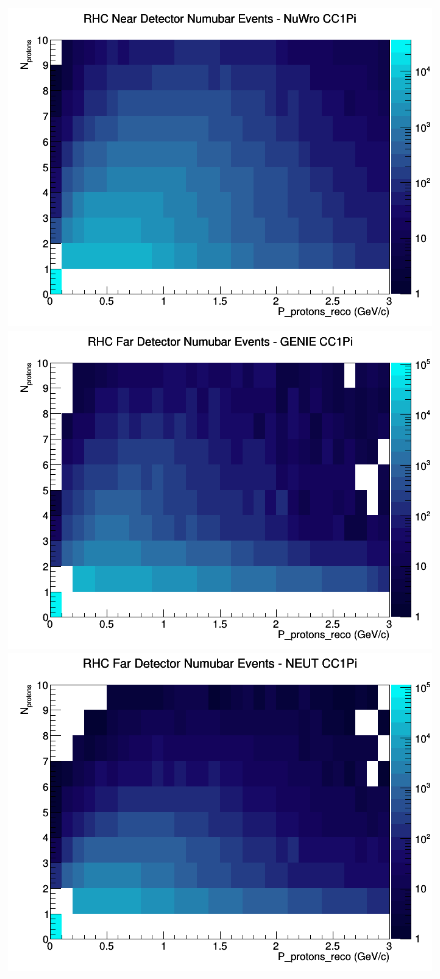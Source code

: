 \documentclass[12pt]{article}
\begin{document}
\begin{figure}[h]
\includegraphics[width=\linewidth]{eff_N_P/GAr/protons/CC1Pi_RHC_ND_numubar_N_P_NuWro.png}
\endminipage
\newline
{}
\includegraphics[width=\linewidth]{eff_N_P/GAr/protons/CC1Pi_RHC_FD_numubar_N_P_GENIE.png}
\endminipage
{}
\includegraphics[width=\linewidth]{eff_N_P/GAr/protons/CC1Pi_RHC_FD_numubar_N_P_NEUT.png}

\end{figure}
\end{document}

